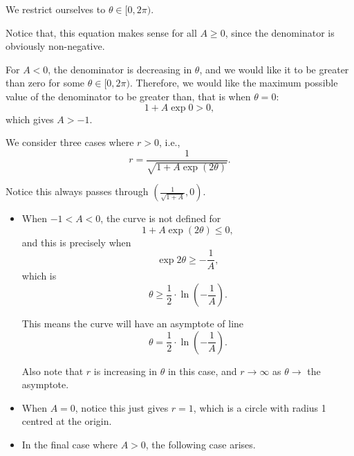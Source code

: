 \begin{enumerate}
          We restrict ourselves to \(\theta \in [0, 2\pi)\).

          Notice that, this equation makes sense for all \(A \geq 0\), since the denominator is obviously non-negative.

          For \(A < 0\), the denominator is decreasing in \(\theta\), and we would like it to be greater than zero for some \(\theta \in [0, 2\pi)\). Therefore, we would like the maximum possible value of the denominator to be greater than, that is when \(\theta = 0\):
          \[
              1 + A \exp 0 > 0,
          \]
          which gives \(A > -1\).

          We consider three cases where \(r > 0\), i.e.,
          \[
              r = \frac{1}{\sqrt{1 + A \exp(2\theta)}}.
          \]

          Notice this always passes through \(\left(\frac{1}{\sqrt{1 + A}}, 0\right)\).

          \begin{itemize}
              \item When \(-1 < A < 0\), the curve is not defined for
                    \[
                        1 + A \exp (2\theta) \leq 0,
                    \]
                    and this is precisely when
                    \[
                        \exp 2\theta \geq -\frac{1}{A},
                    \]
                    which is
                    \[
                        \theta \geq \frac{1}{2} \cdot \ln\left(-\frac{1}{A}\right).
                    \]

                    This means the curve will have an asymptote of line
                    \[
                        \theta = \frac{1}{2} \cdot \ln\left(-\frac{1}{A}\right).
                    \]

                    Also note that \(r\) is increasing in \(\theta\) in this case, and \(r \to \infty\) as \(\theta \to\) the asymptote.

                    \begin{center}
                        
                    \end{center}

              \item When \(A = 0\), notice this just gives \(r = 1\), which is a circle with radius 1 centred at the origin.

                    \begin{center}
                        
                    \end{center}

              \item In the final case where \(A > 0\), the following case arises.

                    \begin{center}
                        
                    \end{center}
          \end{itemize}
\end{enumerate}